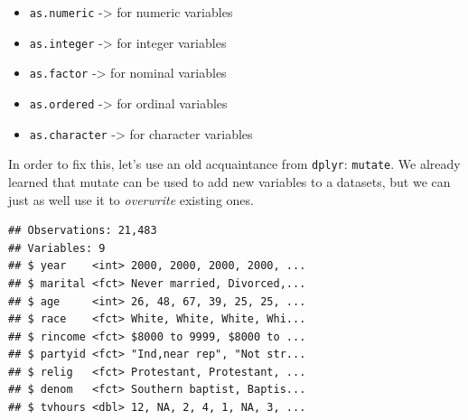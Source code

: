 \documentclass[]{tufte-book}
\newenvironment{Shaded}{}{}
\newcommand{\KeywordTok}[1]{\textcolor[rgb]{0.00,0.44,0.13}{\textbf{#1}}}
\newcommand{\DataTypeTok}[1]{\textcolor[rgb]{0.56,0.13,0.00}{#1}}
\newcommand{\StringTok}[1]{\textcolor[rgb]{0.25,0.44,0.63}{#1}}
\newcommand{\OperatorTok}[1]{\textcolor[rgb]{0.40,0.40,0.40}{#1}}
\newcommand{\NormalTok}[1]{#1}
\providecommand{\tightlist}{%
  \setlength{\itemsep}{0pt}\setlength{\parskip}{0pt}}
\begin{document}
\begin{itemize}
\tightlist
\item
  \texttt{as.numeric} -\textgreater{} for numeric variables
\item
  \texttt{as.integer} -\textgreater{} for integer variables
\item
  \texttt{as.factor} -\textgreater{} for nominal variables
\item
  \texttt{as.ordered} -\textgreater{} for ordinal variables
\item
  \texttt{as.character} -\textgreater{} for character variables
\end{itemize}

In order to fix this, let's use an old acquaintance from \texttt{dplyr}:
\texttt{mutate}. We already learned that mutate can be used to add new
variables to a datasets, but we can just as well use it to
\emph{overwrite} existing ones.

\begin{Shaded}
\end{Shaded}

\begin{verbatim}
## Observations: 21,483
## Variables: 9
## $ year    <int> 2000, 2000, 2000, 2000, ...
## $ marital <fct> Never married, Divorced,...
## $ age     <int> 26, 48, 67, 39, 25, 25, ...
## $ race    <fct> White, White, White, Whi...
## $ rincome <fct> $8000 to 9999, $8000 to ...
## $ partyid <fct> "Ind,near rep", "Not str...
## $ relig   <fct> Protestant, Protestant, ...
## $ denom   <fct> Southern baptist, Baptis...
## $ tvhours <dbl> 12, NA, 2, 4, 1, NA, 3, ...
\end{verbatim}
\end{document}
